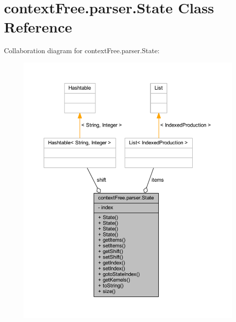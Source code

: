 \hypertarget{classcontext_free_1_1parser_1_1_state}{\section{context\-Free.\-parser.\-State Class Reference}
\label{classcontext_free_1_1parser_1_1_state}
}


Collaboration diagram for context\-Free.\-parser.\-State\-:
\nopagebreak
\begin{figure}[H]
\begin{center}
\leavevmode
\includegraphics[width=350pt]{classcontext_free_1_1parser_1_1_state__coll__graph}
\end{center}
\end{figure}
